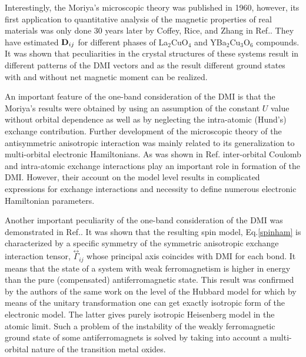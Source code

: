 \documentclass[aps,prl,twocolumn,showpacs,amsmath,amssymb]{revtex4-1}
\begin{document}
Interestingly, the Moriya's microscopic theory was published in 1960, however, its first application to quantitative analysis of the magnetic properties of real materials was only done 30 years later by Coffey, Rice, and Zhang in Ref.\cite{Rice}. They have estimated ${\bf D}_{ij}$  for different phases of La$_2$CuO$_4$ and YBa$_2$Cu$_3$O$_6$ compounds. It was shown that peculiarities in the crystal structures of these systems result in different patterns of the DMI vectors and as the result different ground states with and without net magnetic moment can be realized.

An important feature of the one-band consideration of the DMI is that the Moriya's results were obtained by using an assumption of the constant $U$ value without orbital dependence as well as by neglecting the intra-atomic (Hund's) exchange contribution.
Further development of the microscopic theory of the antisymmetric anisotropic interaction was mainly related to its generalization to multi-orbital electronic Hamiltonians. As was shown in Ref.\cite{aharony} inter-orbital Coulomb and intra-atomic exchange interactions play an important role in formation of the DMI. However, their account on the model level results in complicated expressions for exchange interactions and necessity to define numerous electronic Hamiltonian parameters.

Another important peculiarity of the one-band consideration of the DMI was demonstrated in Ref.\cite{AharonyPRL}. It was shown that the resulting spin model, Eq.\ref{spinham} is characterized by a specific symmetry of the symmetric anisotropic exchange interaction tensor, $\overset{\leftrightarrow}{\Gamma}_{ij}$ whose principal axis coincides with DMI for each bond. It means that the state of a system with weak ferromagnetism is higher in energy than the pure (compensated) antiferromagnetic state. This result was confirmed by the authors of the same work \cite{AharonyPRL} on the level of the Hubbard model for which by means of the unitary transformation one can get exactly isotropic form of the electronic model. The latter gives purely isotropic Heisenberg model in the atomic limit.
Such a problem of the instability of the weakly ferromagnetic ground state of some antiferromagnets is solved by taking into account a multi-orbital nature of the transition metal oxides.
\end{document}
